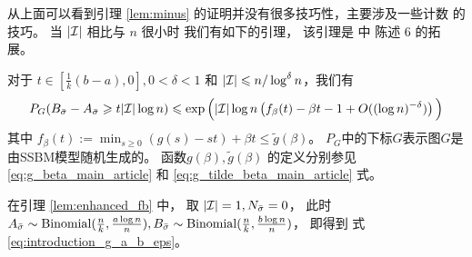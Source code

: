 从上面可以看到引理 \ref{lem:minus} 的证明并没有很多技巧性，主要涉及一些计数
的技巧。
当 $|\mathcal{I}|$ 相比与 $n$ 很小时
我们有如下的引理， 该引理是 \citet{ye2020exact} 中 陈述 6 的拓展。 

\begin{lemma}
  \label{lem:enhanced_fb}
	对于 $t\in [\frac{1}{k}(b-a), 0], 0<\delta <1$
	和 $ |\mathcal{I}| \leqslant n/\log^{\delta} n$，我们有
\begin{equation} \label{eq:upmpt}
	P_G(B_{\bar{\sigma}}-A_{\bar{\sigma}}\geqslant t |\mathcal{I}| \log n) 
	\leqslant  \exp\Big(|\mathcal{I}|\log n
	\left(
    f_{\beta}(t) - \beta t -1	+ O((\log n)^{-\delta}) \right)\Big)
	\end{equation}
	其中 $f_{\beta}(t) := \min_{s\geq 0} (g(s) - st) + \beta t \leq \tilde{g}(\beta) $。
  $P_G$中的下标$G$表示图$G$是由SSBM模型随机生成的。
  函数$g(\beta), \tilde{g}(\beta)$
  的定义分别参见
  \eqref{eq:g_beta_main_article}
  和
  \eqref{eq:g_tilde_beta_main_article} 式。
\end{lemma}

在引理 \ref{lem:enhanced_fb}  中，
取
$|\mathcal{I}|=1, N_{\bar{\sigma}}=0$，
此时$A_{\bar{\sigma}} \sim \operatorname{Binomial}(\frac{n}{k}, \frac{a \log n}{n}),
B_{\bar{\sigma}} \sim \operatorname{Binomial}(\frac{n}{k}, \frac{b \log n}{n})$，
即得到 式\eqref{eq:introduction_g_a_b_eps}。

